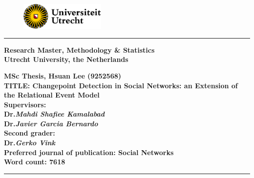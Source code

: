 \documentclass[]{interact}
\theoremstyle{plain}%
\theoremstyle{definition}
\theoremstyle{remark}
\begin{document}
    \begin{titlepage}
	
	    \raggedright %
	
	    \vspace*{-0.9cm}
	
	    \begin{figure}[H]
		    \includegraphics[width=4.2cm]{UU_logo}
	    \end{figure}
	
	    \vspace*{1.4cm}
	
	    \rule{\linewidth}{0.1pt} %
	
	    \vspace{0.3cm}
	    \large
	    \textbf{Research Master, Methodology \& Statistics} \\
	    \vspace{0.2cm}
	    \textbf{Utrecht University, the Netherlands}
	
	    \vspace{3cm}
    	\textbf{MSc Thesis, Hsuan Lee (9252568)} \\
	    \vspace{0.2cm}
	    \textbf{TITLE: Changepoint Detection in Social Networks: an Extension of the Relational Event Model} \\
	
	    \vspace{3cm}
	    \textbf{Supervisors:} \\
	    \vspace{0.2cm}
	    \textbf{Dr.\emph{Mahdi Shafiee Kamalabad}} \\
	    \vspace{0.2cm}
	    \textbf{Dr.\emph{Javier Garcia Bernardo}} \\
	
	    \vspace{1.75cm}
	    \textbf{Second grader:} \\
	    \vspace{0.2cm}
	    \textbf{Dr.\emph{Gerko Vink}} \\
	
	    \vspace{1.75cm}
	    \textbf{Preferred journal of publication: Social Networks} \\
	    \vspace{0.2cm}
	    \textbf{Word count: 7618}
	
	    \rule{\linewidth}{0.1pt} %
	
    \end{titlepage}
\end{document}
